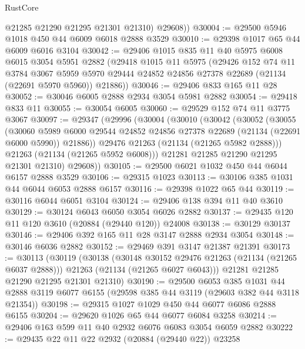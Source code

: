 \begin{lexlean}{RustCore}
\begin{coremodule}
          @21285
          @21290
          @21295
          @21301
          @21310)
        @29608))
@30004 := @29500 @5946 @1018 @450 @44 @6009 @6018 @2888 @3529
@30010 := @29398 @1017 @65 @44 @6009 @6016 @3104
@30042 := @29406
    @1015
    @835
    @11
    @40
    @5975
    @6008
    @6015
    @3054
    @5951
    @2882
    (@29418
      @1015
      @11
      @5975
      (@29426
        @152
        @74
        @11
        @3784
        @3067
        @5959
        @5970
        @29444
        @24852
        @24856
        @27378
        @22689
        (@21134 (@22691 @5970 @5960))
        @21886))
@30046 := @29406 @833 @165 @11 @28
@30052 := @30046 @6005 @2888 @2934 @3054 @5981 @2882
@30054 := @29418 @833 @11
@30055 := @30054 @6005
@30060 := @29529 @152 @74 @11 @3775 @3067
@30097 := @29347
    (@29996
      (@30004
        (@30010
          (@30042
            (@30052
              (@30055
                (@30060
                  @5989
                  @6000
                  @29544
                  @24852
                  @24856
                  @27378
                  @22689
                  (@21134 (@22691 @6000 @5990))
                  @21886))
              @29476
              @21263
              (@21134 (@21265 @5982 @2888)))
            @21263
            (@21134 (@21265 @5952 @6008)))
          @21281
          @21285
          @21290
          @21295
          @21301
          @21310)
        @29608))
@30105 := @29500 @6021 @1032 @450 @44 @6044 @6157 @2888 @3529
@30106 := @29315 @1023
@30113 := @30106 @385 @1031 @44 @6044 @6053 @2888 @6157
@30116 := @29398 @1022 @65 @44
@30119 := @30116 @6044 @6051 @3104
@30124 := @29406 @138 @394 @11 @40 @3610
@30129 := @30124 @6043 @6050 @3054 @6026 @2882
@30137 := @29435 @120 @11 @120 @3610 (@20884 (@29440 @120)) @24008
@30138 := @30129 @30137
@30146 := @29406 @392 @165 @11 @28 @3147 @2888 @2934 @3054
@30148 := @30146 @6036 @2882
@30152 := @29469 @391 @3147 @21387 @21391
@30173 := @30113
    (@30119
      (@30138
        (@30148 @30152 @29476 @21263 (@21134 (@21265 @6037 @2888)))
        @21263
        (@21134 (@21265 @6027 @6043)))
      @21281
      @21285
      @21290
      @21295
      @21301
      @21310)
@30190 := @29500
    @6053
    @385
    @1031
    @44
    @2888
    @3119
    @6077
    @6155
    (@29598 @385 @44 @3119 (@29603 @382 @44 @3118 @21354))
@30198 := @29315 @1027 @1029 @450 @44 @6077 @6086 @2888 @6155
@30204 := @29620 @1026 @65 @44 @6077 @6084 @3258
@30214 := @29406 @163 @599 @11 @40 @2932 @6076 @6083 @3054 @6059 @2882
@30222 := @29435 @22 @11 @22 @2932 (@20884 (@29440 @22)) @23258

\end{coremodule}
\end{lexlean}
